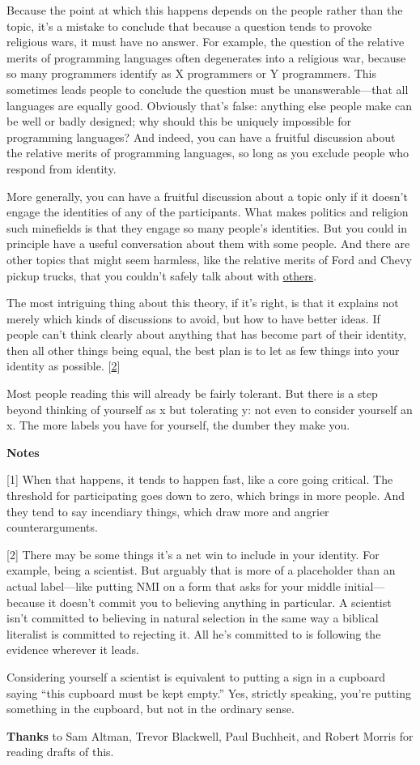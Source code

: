Because the point at which this happens depends on the people rather
than the topic, it's a mistake to conclude that because a question tends
to provoke religious wars, it must have no answer. For example, the
question of the relative merits of programming languages often
degenerates into a religious war, because so many programmers identify
as X programmers or Y programmers. This sometimes leads people to
conclude the question must be unanswerable---that all languages are
equally good. Obviously that's false: anything else people make can be
well or badly designed; why should this be uniquely impossible for
programming languages? And indeed, you can have a fruitful discussion
about the relative merits of programming languages, so long as you
exclude people who respond from identity.

More generally, you can have a fruitful discussion about a topic only if
it doesn't engage the identities of any of the participants. What makes
politics and religion such minefields is that they engage so many
people's identities. But you could in principle have a useful
conversation about them with some people. And there are other topics
that might seem harmless, like the relative merits of Ford and Chevy
pickup trucks, that you couldn't safely talk about with
\href{http://www.theledger.com/apps/pbcs.dll/article?AID=/20060418/NEWS/604180378/1039}{others}.

The most intriguing thing about this theory, if it's right, is that it
explains not merely which kinds of discussions to avoid, but how to have
better ideas. If people can't think clearly about anything that has
become part of their identity, then all other things being equal, the
best plan is to let as few things into your identity as possible.
{[}\hyperref[f2n]{2}{]}

Most people reading this will already be fairly tolerant. But there is a
step beyond thinking of yourself as x but tolerating y: not even to
consider yourself an x. The more labels you have for yourself, the
dumber they make you.

\textbf{Notes}

{[}1{]} When that happens, it tends to happen fast, like a core going
critical. The threshold for participating goes down to zero, which
brings in more people. And they tend to say incendiary things, which
draw more and angrier counterarguments.

{[}2{]} There may be some things it's a net win to include in your
identity. For example, being a scientist. But arguably that is more of a
placeholder than an actual label---like putting NMI on a form that asks
for your middle initial---because it doesn't commit you to believing
anything in particular. A scientist isn't committed to believing in
natural selection in the same way a biblical literalist is committed to
rejecting it. All he's committed to is following the evidence wherever
it leads.

Considering yourself a scientist is equivalent to putting a sign in a
cupboard saying ``this cupboard must be kept empty.'' Yes, strictly
speaking, you're putting something in the cupboard, but not in the
ordinary sense.

\textbf{Thanks} to Sam Altman, Trevor Blackwell, Paul Buchheit, and
Robert Morris for reading drafts of this.
